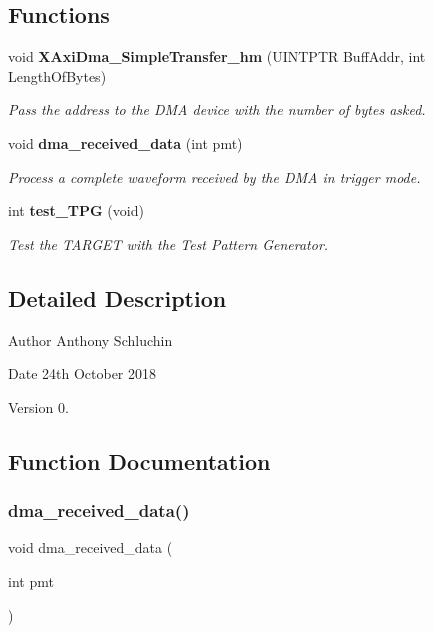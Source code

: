 \subsection*{Functions}
\begin{DoxyCompactItemize}
\item 
void \textbf{ X\+Axi\+Dma\+\_\+\+Simple\+Transfer\+\_\+hm} (U\+I\+N\+T\+P\+TR Buff\+Addr, int Length\+Of\+Bytes)
\begin{DoxyCompactList}\small\item\em Pass the address to the D\+MA device with the number of bytes asked. \end{DoxyCompactList}\item 
void \textbf{ dma\+\_\+received\+\_\+data} (int pmt)
\begin{DoxyCompactList}\small\item\em Process a complete waveform received by the D\+MA in trigger mode. \end{DoxyCompactList}\item 
int \textbf{ test\+\_\+\+T\+PG} (void)
\begin{DoxyCompactList}\small\item\em Test the T\+A\+R\+G\+ET with the Test Pattern Generator. \end{DoxyCompactList}\end{DoxyCompactItemize}


\subsection{Detailed Description}
\begin{DoxyAuthor}{Author}
Anthony Schluchin 
\end{DoxyAuthor}
\begin{DoxyDate}{Date}
24th October 2018 
\end{DoxyDate}
\begin{DoxyVersion}{Version}
0. 
\end{DoxyVersion}


\subsection{Function Documentation}
\mbox{\label{axis__peripheral_8h_ac643f94e9731b6cb46c9c2897887a0d4}} 
\subsubsection{dma\_received\_data()}
{\footnotesize\ttfamily void dma\+\_\+received\+\_\+data (\begin{DoxyParamCaption}\item[{int}]{pmt }\end{DoxyParamCaption})}




